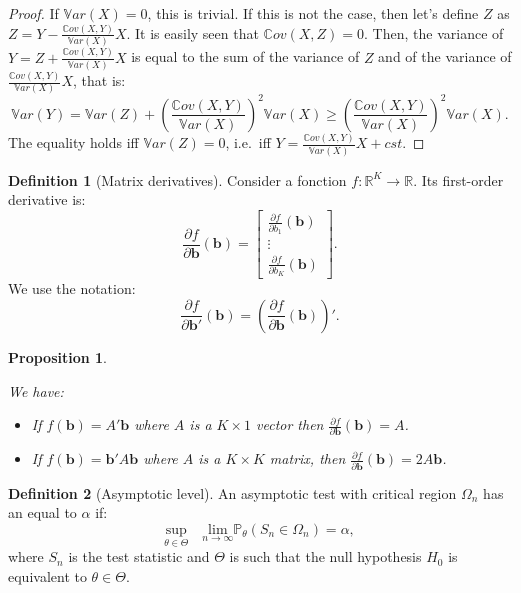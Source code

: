 \documentclass[
]{book}
\providecommand{\tightlist}{%
  \setlength{\itemsep}{0pt}\setlength{\parskip}{0pt}}
\newtheorem{proposition}{Proposition}[chapter]
\theoremstyle{definition}
\newtheorem{definition}{Definition}[chapter]
\theoremstyle{definition}
\theoremstyle{definition}
\theoremstyle{definition}
\theoremstyle{remark}
\begin{document}
\begin{proof}
If \(\mathbb{V}ar(X)=0\), this is trivial. If this is not the case, then let's define \(Z\) as \(Z = Y - \frac{\mathbb{C}ov(X,Y)}{\mathbb{V}ar(X)}X\). It is easily seen that \(\mathbb{C}ov(X,Z)=0\). Then, the variance of \(Y=Z+\frac{\mathbb{C}ov(X,Y)}{\mathbb{V}ar(X)}X\) is equal to the sum of the variance of \(Z\) and of the variance of \(\frac{\mathbb{C}ov(X,Y)}{\mathbb{V}ar(X)}X\), that is:
\[
\mathbb{V}ar(Y) = \mathbb{V}ar(Z) + \left(\frac{\mathbb{C}ov(X,Y)}{\mathbb{V}ar(X)}\right)^2\mathbb{V}ar(X) \ge \left(\frac{\mathbb{C}ov(X,Y)}{\mathbb{V}ar(X)}\right)^2\mathbb{V}ar(X).
\]
The equality holds iff \(\mathbb{V}ar(Z)=0\), i.e.~iff \(Y = \frac{\mathbb{C}ov(X,Y)}{\mathbb{V}ar(X)}X+cst\).
\end{proof}

\begin{definition}[Matrix derivatives]
\protect\hypertarget{def:FOD}{}\label{def:FOD}Consider a fonction \(f: \mathbb{R}^K \rightarrow \mathbb{R}\). Its first-order derivative is:
\[
\frac{\partial f}{\partial \mathbf{b}}(\mathbf{b}) =
\left[\begin{array}{c}
\frac{\partial f}{\partial b_1}(\mathbf{b})\\
\vdots\\
\frac{\partial f}{\partial b_K}(\mathbf{b})
\end{array}
\right].
\]
We use the notation:
\[
\frac{\partial f}{\partial \mathbf{b}'}(\mathbf{b}) = \left(\frac{\partial f}{\partial \mathbf{b}}(\mathbf{b})\right)'.
\]
\end{definition}

\begin{proposition}
\protect\hypertarget{prp:partial}{}\label{prp:partial}

We have:

\begin{itemize}
\tightlist
\item
  If \(f(\mathbf{b}) = A' \mathbf{b}\) where \(A\) is a \(K \times 1\) vector then \(\frac{\partial f}{\partial \mathbf{b}}(\mathbf{b}) = A\).
\item
  If \(f(\mathbf{b}) = \mathbf{b}'A\mathbf{b}\) where \(A\) is a \(K \times K\) matrix, then \(\frac{\partial f}{\partial \mathbf{b}}(\mathbf{b}) = 2A\mathbf{b}\).
\end{itemize}

\end{proposition}

\begin{definition}[Asymptotic level]
\protect\hypertarget{def:asmyptlevel}{}\label{def:asmyptlevel}An asymptotic test with critical region \(\Omega_n\) has an \color{blue}{asymptotic level} equal to \(\alpha\) if:
\[
\underset{\theta \in \Theta}{\mbox{sup}} \quad \underset{n \rightarrow \infty}{\mbox{lim}} \mathbb{P}_\theta (S_n \in \Omega_n) = \alpha,
\]
where \(S_n\) is the test statistic and \(\Theta\) is such that the null hypothesis \(H_0\) is equivalent to \(\theta \in \Theta\).
\end{definition}
\end{document}

